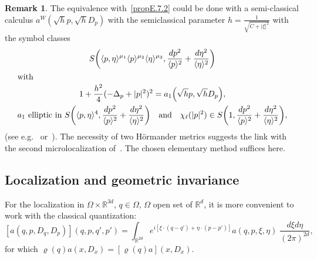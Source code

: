 \documentclass[10pt]{amsart}
\theoremstyle{definition}\newtheorem{defi}[theo]{Definition}\newtheorem{rema}[theo]{Remark}\newtheorem{exam}[theo]{Example}\newtheorem{exem}[theo]{Example}\newtheorem{nota}[theo]{Notation}
\newcommand{\R}{\mathbb{R}}
\let\originalleft\left
\let\originalright\right
\renewcommand{\left}{\mathopen{}\mathclose\bgroup\originalleft}
\renewcommand{\right}{\aftergroup\egroup\originalright}
\begin{document}
\begin{rema}\label{re:2ndmicro}
The equivalence with~\eqref{propE.7.2} could be done with a semi-classical calculus $a^{W}(\sqrt{h}p,\sqrt{h}D_{p})$ with the semiclassical parameter $h=\frac{1}{\sqrt{C+|\xi|^{2}}}$ with the symbol classes 
\begin{gather*}
S\left(\langle p,\eta\rangle^{\mu_{1}}\langle p\rangle^{\mu_{2}}\langle \eta\rangle^{\mu_{3}},\frac{dp^{2}}{\langle p\rangle^{2}}+\frac{d\eta^{2}}{\langle \eta\rangle^{2}}\right)\\
\intertext{with} 1+\frac{h^{2}}{4}(-\Delta_{p}+|p|^{2})^{2}=a_{1}\left(\sqrt{h}p,\sqrt{h}D_{p}\right),\\
a_{1}\text{ elliptic in } S\left(\langle p,\eta\rangle^{4},\frac{dp^{2}}{\langle p\rangle^{2}}+\frac{d\eta^{2}}{\langle \eta\rangle^{2}}\right) \quad\text{and}\quad \chi_{\ell}(|p|^{2})\in S\left(1,\frac{dp^{2}}{\langle p\rangle^{2}}+\frac{d\eta^{2}}{\langle \eta\rangle^{2}}\right),
\end{gather*}
(see e.g.~\cite{Rob} or~\cite{NaNi}). The necessity of two H\"ormander metrics suggests the link with the second microlocalization of~\cite{BoLe}. The chosen elementary method suffices here.
\end{rema}

\subsection{Localization and geometric invariance}\label{sec:geominv}

For the localization in $\Omega\times \R^{3d}$, $q\in \Omega$, $\Omega$ open set of $\R^{d}$, it is more convenient to work with the classical quantization:
\[
[a(q,p,D_{q},D_{p})](q,p,q',p')=\int_{\R^{2d}}e^{i[\xi\cdot(q-q')+\eta\cdot(p-p')]}a(q,p,\xi,\eta)\;\frac{d\xi d\eta}{(2\pi)^{2d}},
\]
for which $\varrho(q)a(x,D_{x})=[\varrho(q)a](x,D_{x})$.
\end{document}
